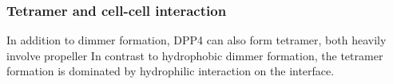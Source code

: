\subsubsection{Tetramer and cell-cell interaction}

In addition to dimmer formation, DPP4 can also form tetramer, both heavily involve propeller In contrast to hydrophobic dimmer formation, the tetramer formation is dominated by hydrophilic interaction on the interface.~\cite{Engel_2003} 